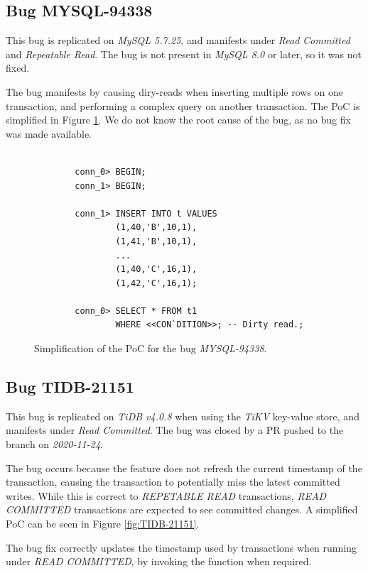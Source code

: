 \subsection*{Bug MYSQL-94338}

This bug is replicated on \textit{MySQL 5.7.25}, and manifests under \textit{Read Committed} and \textit{Repeatable Read}. The bug is not present in \textit{MySQL 8.0} or later, so it was not fixed.

The bug manifests by causing diry-reads when inserting multiple rows on one transaction, and performing a complex query on another transaction. The PoC is simplified in Figure \ref{fig:MYSQL-94338}. We do not know the root cause of the bug, as no bug fix was made available.

\begin{figure}[H]
\begin{verbatim}

        conn_0> BEGIN;
        conn_1> BEGIN;

        conn_1> INSERT INTO t VALUES
                (1,40,'B',10,1),
                (1,41,'B',10,1),
                ...
                (1,40,'C',16,1),
                (1,42,'C',16,1);

        conn_0> SELECT * FROM t1
                WHERE <<CON`DITION>>; -- Dirty read.;
\end{verbatim}
\caption{Simplification of the PoC for the bug \textit{MYSQL-94338}.} \label{fig:MYSQL-94338}
\end{figure}

\subsection*{Bug TIDB-21151}

This bug is replicated on \textit{TiDB v4.0.8} when using the \textit{TiKV} key-value store, and manifests under \textit{Read Committed}. The bug was closed by a PR pushed to the  branch on \textit{2020-11-24}.

The bug occurs because the  feature does not refresh the current timestamp of the transaction, causing the transaction to potentially miss the latest committed writes. While this is correct to \textit{REPETABLE READ} transactions, \textit{READ COMMITTED} transactions are expected to see committed changes. A simplified PoC can be seen in Figure \ref{fig:TIDB-21151}. 

The bug fix correctly updates the timestamp used by transactions when running under \textit{READ COMMITTED}, by invoking the  function when required.

